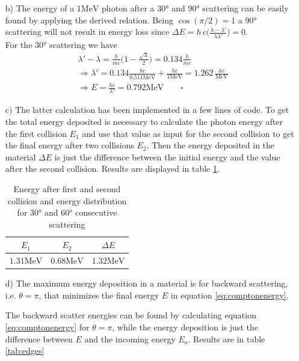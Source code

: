 \documentclass[10pt,a4paper]{article}
\newcommand{\mev}{\si{\mega\electronvolt}}
\begin{document}
\begin{enumerate}
\item[b)] The energy of a $1\mev$ photon after a $30\si{\degree}$ and $90\si{\degree}$ scattering can be easily found by applying the derived relation. Being $\cos(\pi/2)=1$ a $90\si{\degree}$ scattering will not result in energy loss since $\Delta E = h\,c\big( \frac{\lambda-\lambda'}{\lambda\lambda'}\big) = 0$.\\
 For the $30\si{\degree}$ scattering we have
\begin{align*}
&\lambda'-\lambda = \frac{h}{mc}\big( 1-\frac{\sqrt{3}}{2}\big) = 0.134\frac{h}{mc}\\
&\Rightarrow \lambda' = 0.134\frac{hc}{0.511\mev} + \frac{hc}{1\mev} =1.262\,\frac{hc}{\mev}\\
&\Rightarrow E = \frac{hc}{\lambda'} = 0.792\mev\qquad\square
\end{align*}

\item[c)] The latter calculation has been implemented in a few lines of code. To get the total energy deposited is necessary to calculate the photon energy after the first collision $E_1$ and use that value as input for the second collision to get the final energy after two collisions $E_2$. Then the energy deposited in the material $\Delta E$ is just the difference between the initial energy and the value after the second collision. Results are displayed in table \ref{tab:compton}.
\begin{table}[!ht]
\centering
\begin{tabular}{ccc}
\toprule
  $E_1$ & $E_2$ & $\Delta E$ \\
  \midrule
  $1.31\mev$ & $0.68\mev$ & $1.32\mev$ \\
  \bottomrule
\end{tabular}
\caption{Energy after first and second collision and energy distribution for $30\si{\degree}$ and $60\si{\degree}$ consecutive scattering}
\label{tab:compton}
\end{table}

\item[d)]The maximum energy deposition in a material is for backward scattering, i.e. $\theta = \pi$, that minimizes the final energy $E$ in equation \ref{eq:comptonenergy}.

The backward scatter energies can be found by calculating equation \ref{eq:comptonenergy} for $\theta = \pi$, while the energy deposition is just the difference between $E$ and the incoming energy $E_o$. Results are in table \ref{tab:edges}


\end{enumerate}
\end{document}
